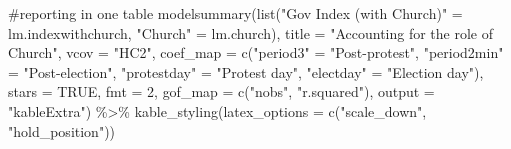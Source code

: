 \documentclass[
  letterpaper,
  DIV=11,
  numbers=noendperiod]{scrartcl}
\newenvironment{Shaded}{\begin{snugshade}}{\end{snugshade}}
\newcommand{\AttributeTok}[1]{\textcolor[rgb]{0.40,0.45,0.13}{#1}}
\newcommand{\CommentTok}[1]{\textcolor[rgb]{0.37,0.37,0.37}{#1}}
\newcommand{\ConstantTok}[1]{\textcolor[rgb]{0.56,0.35,0.01}{#1}}
\newcommand{\DecValTok}[1]{\textcolor[rgb]{0.68,0.00,0.00}{#1}}
\newcommand{\FunctionTok}[1]{\textcolor[rgb]{0.28,0.35,0.67}{#1}}
\newcommand{\NormalTok}[1]{\textcolor[rgb]{0.00,0.23,0.31}{#1}}
\newcommand{\OtherTok}[1]{\textcolor[rgb]{0.00,0.23,0.31}{#1}}
\newcommand{\SpecialCharTok}[1]{\textcolor[rgb]{0.37,0.37,0.37}{#1}}
\newcommand{\StringTok}[1]{\textcolor[rgb]{0.13,0.47,0.30}{#1}}
\begin{document}
\begin{Shaded}
\begin{Highlighting}[]
\CommentTok{\#reporting in one table}
\FunctionTok{modelsummary}\NormalTok{(}\FunctionTok{list}\NormalTok{(}\StringTok{"Gov Index (with Church)"} \OtherTok{=}\NormalTok{ lm.indexwithchurch, }
                  \StringTok{"Church"} \OtherTok{=}\NormalTok{ lm.church),}
             \AttributeTok{title =} \StringTok{"Accounting for the role of Church"}\NormalTok{,}
             \AttributeTok{vcov =} \StringTok{"HC2"}\NormalTok{,}
             \AttributeTok{coef\_map =} \FunctionTok{c}\NormalTok{(}\StringTok{"period3"} \OtherTok{=} \StringTok{"Post{-}protest"}\NormalTok{, }
             \StringTok{"period2min"} \OtherTok{=} \StringTok{"Post{-}election"}\NormalTok{, }\StringTok{"protestday"} \OtherTok{=} \StringTok{"Protest day"}\NormalTok{, }
             \StringTok{"electday"} \OtherTok{=} \StringTok{"Election day"}\NormalTok{),}
             \AttributeTok{stars =} \ConstantTok{TRUE}\NormalTok{, }\AttributeTok{fmt =} \DecValTok{2}\NormalTok{, }\AttributeTok{gof\_map =} \FunctionTok{c}\NormalTok{(}\StringTok{"nobs"}\NormalTok{, }\StringTok{"r.squared"}\NormalTok{),}
             \AttributeTok{output =} \StringTok{"kableExtra"}\NormalTok{) }\SpecialCharTok{\%\textgreater{}\%} 
   \FunctionTok{kable\_styling}\NormalTok{(}\AttributeTok{latex\_options =} \FunctionTok{c}\NormalTok{(}\StringTok{"scale\_down"}\NormalTok{, }\StringTok{"hold\_position"}\NormalTok{))}
\end{Highlighting}
\end{Shaded}

\begin{table}[!h]
\centering\centering
\caption{\label{tab:unnamed-chunk-11}Accounting for the role of Church}
\centering
{}
\end{table}
\end{document}
